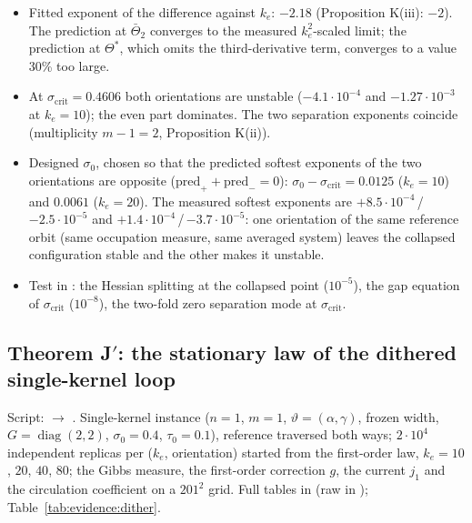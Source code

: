 \begin{itemize}
  \item Fitted exponent of the difference against $k_e$: $-2.18$ (Proposition K(iii): $-2$). The prediction at
    $\bar\Theta_2$ converges to the measured $k_e^2$-scaled limit; the prediction at $\Theta^*$, which omits the
    third-derivative term, converges to a value 30\% too large.
  \item At $\sigma_{\mathrm{crit}}=0.4606$ both orientations are unstable ($-4.1\cdot10^{-4}$ and $-1.27\cdot10^{-3}$
    at $k_e=10$); the even part dominates. The two separation exponents coincide (multiplicity $m-1=2$,
    Proposition K(ii)).
  \item Designed $\sigma_0$, chosen so that the predicted softest exponents of the two orientations are opposite
    ($\mathrm{pred}_++\mathrm{pred}_-=0$): $\sigma_0-\sigma_{\mathrm{crit}}=0.0125$ ($k_e=10$) and $0.0061$
    ($k_e=20$). The measured softest exponents are $+8.5\cdot10^{-4}$\,/\,$-2.5\cdot10^{-5}$ and
    $+1.4\cdot10^{-4}$\,/\,$-3.7\cdot10^{-5}$: one orientation of the same reference orbit (same occupation measure,
    same averaged system) leaves the collapsed configuration stable and the other makes it unstable.
  \item \begin{sloppypar}Test  in
    : the Hessian splitting at the collapsed point ($10^{-5}$), the gap equation of
    $\sigma_{\mathrm{crit}}$ ($10^{-8}$), the two-fold zero separation mode at
    $\sigma_{\mathrm{crit}}$.\end{sloppypar}
\end{itemize}

\subsection{Theorem J\texorpdfstring{$'$}{'}: the stationary law of the dithered single-kernel loop}

Script:  $\to$ . Single-kernel instance ($n=1$, $m=1$,
$\vartheta=(\alpha,\gamma)$, frozen width, $G=\operatorname{diag}(2,2)$, $\sigma_0=0.4$, $\tau_0=0.1$), reference
traversed both ways; $2\cdot10^4$ independent replicas per ($k_e$, orientation) started from the first-order law,
$k_e=10$, $20$, $40$, $80$; the Gibbs measure, the first-order correction $g$, the current $j_1$ and the circulation
coefficient on a $201^2$ grid. Full tables in  (raw in );
Table~\ref{tab:evidence:dither}.

